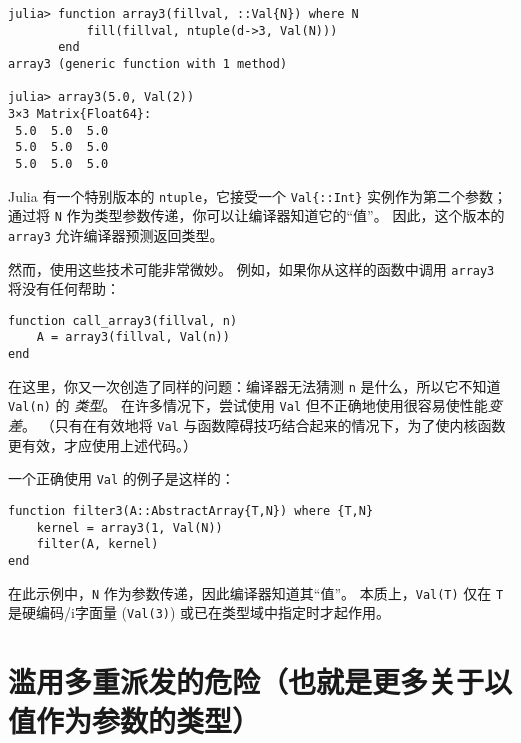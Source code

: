 \begin{verbatim}
julia> function array3(fillval, ::Val{N}) where N
           fill(fillval, ntuple(d->3, Val(N)))
       end
array3 (generic function with 1 method)

julia> array3(5.0, Val(2))
3×3 Matrix{Float64}:
 5.0  5.0  5.0
 5.0  5.0  5.0
 5.0  5.0  5.0
\end{verbatim}



Julia 有一个特别版本的 \texttt{ntuple}，它接受一个 \texttt{Val\{::Int\}} 实例作为第二个参数； 通过将 \texttt{N} 作为类型参数传递，你可以让编译器知道它的“值”。 因此，这个版本的 \texttt{array3} 允许编译器预测返回类型。



然而，使用这些技术可能非常微妙。 例如，如果你从这样的函数中调用 \texttt{array3} 将没有任何帮助：




\begin{verbatim}
function call_array3(fillval, n)
    A = array3(fillval, Val(n))
end
\end{verbatim}



在这里，你又一次创造了同样的问题：编译器无法猜测 \texttt{n} 是什么，所以它不知道 \texttt{Val(n)} 的 \emph{类型}。 在许多情况下，尝试使用 \texttt{Val} 但不正确地使用很容易使性能\emph{变差}。 （只有在有效地将 \texttt{Val} 与函数障碍技巧结合起来的情况下，为了使内核函数更有效，才应使用上述代码。）



一个正确使用 \texttt{Val} 的例子是这样的：




\begin{verbatim}
function filter3(A::AbstractArray{T,N}) where {T,N}
    kernel = array3(1, Val(N))
    filter(A, kernel)
end
\end{verbatim}



在此示例中，\texttt{N} 作为参数传递，因此编译器知道其“值”。 本质上，\texttt{Val(T)} 仅在 \texttt{T} 是硬编码/i字面量 (\texttt{Val(3)}) 或已在类型域中指定时才起作用。



\hypertarget{3314341132664326955}{}


\section{滥用多重派发的危险（也就是更多关于以值作为参数的类型）}



